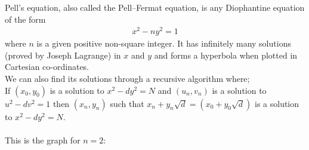 \begin{mathbox}{}
{Pell's equation, also called the Pell–Fermat equation, is any Diophantine equation of the form 
\begin{align*}
x^{2}-ny^{2}=1
\end{align*}
where $n$ is a given positive non-square integer. It has infinitely many solutions (proved by Joseph Lagrange) in $x$ and $y$ and forms a hyperbola when plotted in Cartesian co-ordinates.\\
We can also find its solutions through a recursive algorithm where;\\
If $(x_{0},y_{0})$ is a solution to $x^{2}-dy^{2}=N$ and $(u_{n},v_{n})$ is a solution to $u^{2}-dv^{2}=1$ then $(x_n,y_n)$ such that $x_n+y_n \sqrt{d}=(x_{0}+y_{0}{\sqrt{d}})$ is a solution to $x^{2}-dy^{2}=N.$\\\\
This is the graph for $n = 2$:
\begin{center}
\end{center}}
\end{mathbox}
